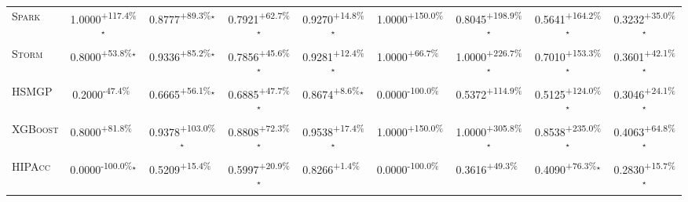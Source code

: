 \begin{table}[htbp]
\begin{tabular}{l|cccc|cccc}
\textsc{Spark} & \cellcolor{green!30}1.0000\textsuperscript{+117.4\%}$^\star$ & \cellcolor{green!30}0.8777\textsuperscript{+89.3\%}$^\star$ & \cellcolor{green!30}0.7921\textsuperscript{+62.7\%}$^\star$ & \cellcolor{green!30}0.9270\textsuperscript{+14.8\%}$^\star$ & \cellcolor{green!30}1.0000\textsuperscript{+150.0\%}$^{\,\,\,}$ & \cellcolor{green!30}0.8045\textsuperscript{+198.9\%}$^\star$ & \cellcolor{green!30}0.5641\textsuperscript{+164.2\%}$^\star$ & \cellcolor{green!30}0.3232\textsuperscript{+35.0\%}$^\star$ \\
\textsc{Storm} & \cellcolor{green!30}0.8000\textsuperscript{+53.8\%}$^\star$ & \cellcolor{green!30}0.9336\textsuperscript{+85.2\%}$^\star$ & \cellcolor{green!30}0.7856\textsuperscript{+45.6\%}$^\star$ & \cellcolor{green!30}0.9281\textsuperscript{+12.4\%}$^\star$ & \cellcolor{green!30}1.0000\textsuperscript{+66.7\%}$^{\,\,\,}$ & \cellcolor{green!30}1.0000\textsuperscript{+226.7\%}$^\star$ & \cellcolor{green!30}0.7010\textsuperscript{+153.3\%}$^\star$ & \cellcolor{green!30}0.3601\textsuperscript{+42.1\%}$^\star$ \\
\textsc{HSMGP} & \cellcolor{red!30}0.2000\textsuperscript{-47.4\%}$^{\,\,\,}$ & \cellcolor{green!30}0.6665\textsuperscript{+56.1\%}$^\star$ & \cellcolor{green!30}0.6885\textsuperscript{+47.7\%}$^\star$ & \cellcolor{green!30}0.8674\textsuperscript{+8.6\%}$^\star$ & \cellcolor{red!30}0.0000\textsuperscript{-100.0\%}$^{\,\,\,}$ & \cellcolor{green!30}0.5372\textsuperscript{+114.9\%}$^{\,\,\,}$ & \cellcolor{green!30}0.5125\textsuperscript{+124.0\%}$^\star$ & \cellcolor{green!30}0.3046\textsuperscript{+24.1\%}$^\star$ \\
\textsc{XGBoost} & \cellcolor{green!30}0.8000\textsuperscript{+81.8\%}$^{\,\,\,}$ & \cellcolor{green!30}0.9378\textsuperscript{+103.0\%}$^\star$ & \cellcolor{green!30}0.8808\textsuperscript{+72.3\%}$^\star$ & \cellcolor{green!30}0.9538\textsuperscript{+17.4\%}$^\star$ & \cellcolor{green!30}1.0000\textsuperscript{+150.0\%}$^{\,\,\,}$ & \cellcolor{green!30}1.0000\textsuperscript{+305.8\%}$^\star$ & \cellcolor{green!30}0.8538\textsuperscript{+235.0\%}$^\star$ & \cellcolor{green!30}0.4063\textsuperscript{+64.8\%}$^\star$ \\
\textsc{HIPAcc} & \cellcolor{red!30}0.0000\textsuperscript{-100.0\%}$^\star$ & \cellcolor{green!30}0.5209\textsuperscript{+15.4\%}$^{\,\,\,}$ & \cellcolor{green!30}0.5997\textsuperscript{+20.9\%}$^\star$ & \cellcolor{green!30}0.8266\textsuperscript{+1.4\%}$^{\,\,\,}$ & \cellcolor{red!30}0.0000\textsuperscript{-100.0\%}$^{\,\,\,}$ & \cellcolor{green!30}0.3616\textsuperscript{+49.3\%}$^{\,\,\,}$ & \cellcolor{green!30}0.4090\textsuperscript{+76.3\%}$^\star$ & \cellcolor{green!30}0.2830\textsuperscript{+15.7\%}$^\star$ \\

\end{tabular}
\end{table}
